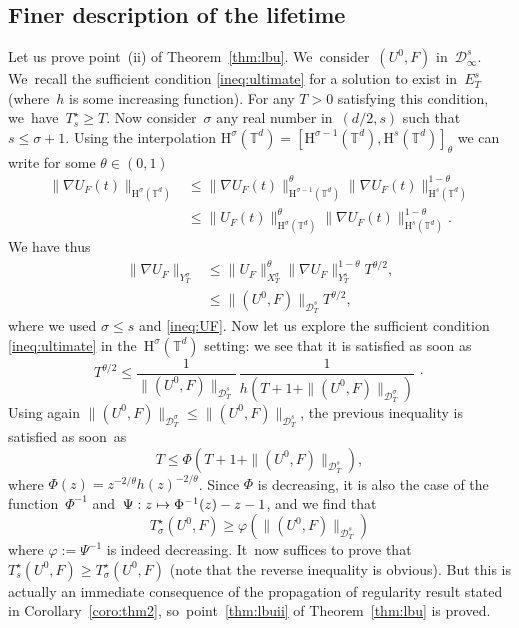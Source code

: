 \documentclass[JEP,XML,SOM,Unicode,published]{cedram}
\newcommand\mto{\mathchoice{\longmapsto}{\mapsto}{\mapsto}{\mapsto}}
\theoremstyle{definition}
\newcommand\T{\mathbb{T}}
\renewcommand\H{\mathrm{H}}
\let\ffi\varphi
\begin{document}
\subsection{Finer description of the lifetime}
Let us prove point~(ii) of Theorem~\ref{thm:lbu}. We~consider~$(U^0,F)$ in~$\mathcal D_\infty^{s}$. We~recall the sufficient condition \eqref{ineq:ultimate} for a solution to
exist in~$E_T^s$
(where~$h$ is some increasing function). For any $T>0$ satisfying this condition, we~have~$T_s^\star \geq T$.
Now consider~$\sigma $ any real number in~$ (d/2,s)$ such that \hbox{$s \leq \sigma+1$}. Using the interpolation $\H^\sigma(\T^d) = [\H^{\sigma-1}(\T^d),\H^s(\T^d)]_\theta$ we can write for some $\theta\in(0,1)$
\begin{align*}
\|\nabla U_F(t)\|_{\H^{\sigma}(\T^d)} &\leq \|\nabla U_F(t)\|_{\H^{\sigma-1}(\T^d)}^\theta \|\nabla U_F(t)\|_{\H^s(\T^d)}^{1-\theta}\\
&\leq \|U_F(t)\|_{\H^{\sigma}(\T^d)}^\theta \|\nabla U_F(t)\|_{\H^s(\T^d)}^{1-\theta}.
\end{align*}
We have thus
\begin{align*}
\|\nabla U_F\|_{Y_T^\sigma} &\leq \|U_F\|_{X_T^\sigma}^\theta \|\nabla U_F\|_{Y_T^s}^{1-\theta} T^{\theta/2},\\
&\leq \| (U^0,F)\| _{\mathcal D_T^{s}} T^{\theta/2},
\end{align*}
where we used $\sigma\leq s$ and \eqref{ineq:UF}. Now let us explore the sufficient condition \eqref{ineq:ultimate} in the~$\H^\sigma(\T^d)$ setting: we see that it is satisfied as soon as
\[
T^{\theta/2} \leq \frac{1}{ \| (U^0,F)\| _{\mathcal D_T^{s}}}\,\frac{1}{h(T+1+ \| (U^0,F)\| _{\mathcal D_T^{\sigma}})} \, \cdotp
\]
Using again $ \| (U^0,F)\| _{\mathcal D_T^{\sigma}}\!\leq\! \| (U^0,F)\| _{\mathcal D_T^{s}}$, the previous inequality is satisfied as soon~as\vspace*{-3pt}
\[
T \leq \Phi(T+1+ \| (U^0,F)\| _{\mathcal D_T^{s}}),
\]
where $\Phi(z)=z^{-2/\theta}h(z)^{-2/\theta}$. Since $\Phi$ is decreasing, it is also the case of the function~$\Phi^{-1}$ and~$\Psi:z\mto \Phi^{-1}(z)-z-1$, and we find that\vspace*{-3pt}\enlargethispage{.5\baselineskip}
\[
T_\sigma^\star (U^0,F)\geq \varphi (\| (U^0,F)\| _{\mathcal D_T^{s}})
\]
where $\ffi:=\Psi^{-1}$ is indeed decreasing. It~now suffices to prove that~$T_s^\star (U^0,F)\geq T_\sigma^\star (U^0,F)$ (note that the reverse inequality is obvious). But this is actually an immediate consequence
of the propagation of regularity result stated in Corollary~\ref{coro:thm2}, so~point~\eqref{thm:lbuii} of Theorem~\ref{thm:lbu} is proved.
\end{document}

